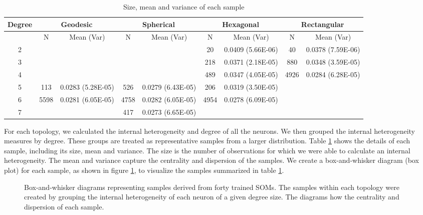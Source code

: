 \begin{table}[htb]
\centering
\scriptsize
\begin{minipage}{\textwidth}
\caption{Size, mean and variance of each sample}
\label{meanvar1}
\begin{tabular}{|c||cc|cc|cc|cc|}
\hline
\textbf{Degree} & \multicolumn{2}{c|}{\textbf{Geodesic}} &
\multicolumn{2}{c|}{\textbf{Spherical}} &
\multicolumn{2}{c|}{\textbf{Hexagonal}} &
\multicolumn{2}{c|}{\textbf{Rectangular}} \\
\hline
& N & Mean (Var) & N & Mean (Var) & N & Mean (Var) & N & Mean (Var) \\
\hline
2&&&&& 20& 0.0409 (5.66E-06)& 40& 0.0378 (7.59E-06)\\ 
3&&&&& 218& 0.0371 (2.18E-05)& 880& 0.0348 (3.59E-05)\\ 
4&&&&& 489& 0.0347 (4.05E-05)& 4926& 0.0284 (6.28E-05)\\ 
5& 113& 0.0283 (5.28E-05)& 526& 0.0279 (6.43E-05)& 206& 0.0319 (3.50E-05)&&\\ 
6& 5598& 0.0281 (6.05E-05)& 4758& 0.0282 (6.05E-05)& 4954& 0.0278
(6.09E-05)&&\\ 
7&&& 417& 0.0273 (6.65E-05)&&&&\\ 
\hline
\end{tabular} \end{minipage} \end{table}

For each topology, we calculated the internal heterogeneity and degree of
all the neurons.  We then grouped the internal heterogeneity measures by degree.  These groups are
treated as representative samples from a larger distribution. Table \ref{meanvar1}
shows the details of each sample, including its size, mean and variance. 
The size is the number of observations for which we were able to calculate an
internal heterogeneity. The mean and variance capture the centrality and
dispersion of the samples.  We create a box-and-whisker diagram (box plot) for
each sample, as shown in figure \ref{boxplot}, to visualize the samples
summarized in table \ref{meanvar1}.

\begin{figure}[htb]
\centering
{}
\caption{Box-and-whisker diagrams representing samples derived from forty
trained SOMs.  The samples within each topology were created by grouping the
internal heterogeneity of each neuron of a given degree size. The diagrams how the
centrality and dispersion of each sample.}
\label{boxplot}
\end{figure}


